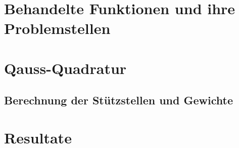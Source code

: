 \documentclass[12pt]{article}
\begin{document}
\section{Behandelte Funktionen und ihre Problemstellen}


\newpage

\section{Qauss-Quadratur}
\subsection{Berechnung der Stützstellen und Gewichte}

\newpage

\section{Resultate}

\newpage
\end{document}
